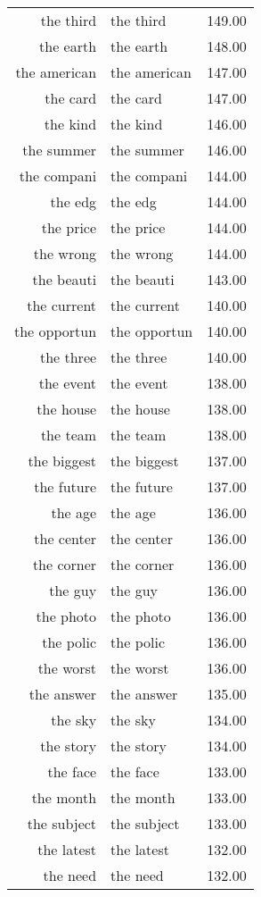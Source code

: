 \begin{table}[ht]
\begin{tabular}{rlr}
  the third & the third & 149.00 \\ 
  the earth & the earth & 148.00 \\ 
  the american & the american & 147.00 \\ 
  the card & the card & 147.00 \\ 
  the kind & the kind & 146.00 \\ 
  the summer & the summer & 146.00 \\ 
  the compani & the compani & 144.00 \\ 
  the edg & the edg & 144.00 \\ 
  the price & the price & 144.00 \\ 
  the wrong & the wrong & 144.00 \\ 
  the beauti & the beauti & 143.00 \\ 
  the current & the current & 140.00 \\ 
  the opportun & the opportun & 140.00 \\ 
  the three & the three & 140.00 \\ 
  the event & the event & 138.00 \\ 
  the house & the house & 138.00 \\ 
  the team & the team & 138.00 \\ 
  the biggest & the biggest & 137.00 \\ 
  the future & the future & 137.00 \\ 
  the age & the age & 136.00 \\ 
  the center & the center & 136.00 \\ 
  the corner & the corner & 136.00 \\ 
  the guy & the guy & 136.00 \\ 
  the photo & the photo & 136.00 \\ 
  the polic & the polic & 136.00 \\ 
  the worst & the worst & 136.00 \\ 
  the answer & the answer & 135.00 \\ 
  the sky & the sky & 134.00 \\ 
  the story & the story & 134.00 \\ 
  the face & the face & 133.00 \\ 
  the month & the month & 133.00 \\ 
  the subject & the subject & 133.00 \\ 
  the latest & the latest & 132.00 \\ 
  the need & the need & 132.00 \\ 

\end{tabular}
\end{table}
